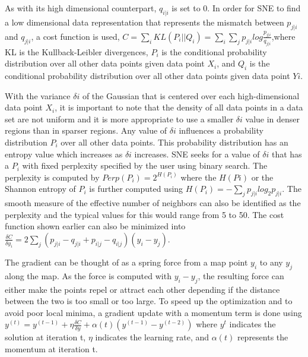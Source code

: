 As with its high dimensional counterpart, $q_{i|i}$ is set to 0. In order for SNE to find a low dimensional data representation that represents the mismatch between $p_{j|i}$ and $q_{j|i}$, a cost function is used, $C = \sum_{i} KL(P_i||Q_i) = \sum_{i}\sum_{j} p_{j|i} log \frac{p_{j|i}}{q_{j|i}}$,where KL is the Kullback-Leibler divergences, $P_i$ is the conditional probability distribution over all other data points given data point $X_i$, and $Q_i$ is the conditional probability distribution over all other data points given data point $Yi$.

With the variance $\delta i$  of the Gaussian that is centered over each high-dimensional data point $X_i$, it is important to note that the density of all data points in a data set are not uniform and it is more appropriate to use a smaller $\delta i$ value in denser regions than in sparser regions. Any value of $\delta i$ influences a probability distribution $P_i$ over all other data points. This probability distribution has an entropy value which increases as $\delta i$ increases. SNE seeks for a value of $\delta i$ that has a $P_i$ with fixed perplexity specified by the user using binary search. The perplexity is computed by $Perp(P_i) = 2^{H(P_i)}$ where the $H(Pi)$ or the Shannon entropy of $P_i$ is further computed using $H(P_i) = -\sum_{j} p_{j|i} log_2 p_{j|i}$. The smooth measure of the effective number of neighbors can also be identified as the perplexity and the typical values for this would range from 5 to 50. The cost function shown earlier can also be minimized into $\frac{\delta C}{\delta y_i} = 2\sum_{j} (p_{j|i} - q_{j|i} + p_{i|j} - q_{i|j})(y_i - y_j)$.

The gradient can be thought of as a spring force from a map point $y_i$ to any $y_j$ along the map. As the force is computed with $y_i-y_j$, the resulting force can either make the points repel or attract each other depending if the distance between the two is too small or too large. To speed up the optimization and to avoid poor local minima, a gradient update with a momentum term is done using $y^{(t)} = y^{(t-1)} + \eta \frac{\delta C}{\delta y} + \alpha (t) (y^{(t-1)}-y^{(t-2)})$ where $y^t$ indicates the solution at iteration t, $\eta$ indicates the learning rate, and $\alpha (t)$ represents the momentum at iteration t.

